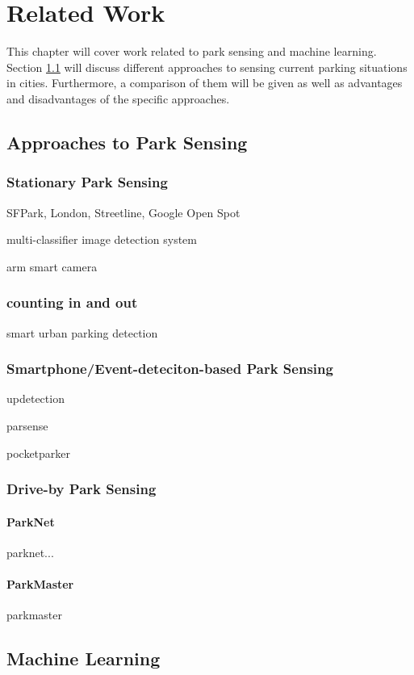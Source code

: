\chapter{Related Work}
\label{chap:relatedwork}

This chapter will cover work related to park sensing and machine learning. Section \ref{sec:parksensing} will discuss different approaches to sensing current parking situations in cities. Furthermore, a comparison of them will be given as well as advantages and disadvantages of the specific approaches. 



\section{Approaches to Park Sensing}
\label{sec:parksensing}

\subsection{Stationary Park Sensing}

SFPark, London, Streetline, Google Open Spot

multi-classifier image detection system\cite{stationary_camera_sensing}

arm smart camera \cite{stationary_camera_sensing_arm_smart_camera}

\subsection{counting in and out}
smart urban parking detection \cite{smarturbanparkingdetection}

\subsection{Smartphone/Event-deteciton-based Park Sensing}


updetection\cite{Ma:2014:USP:2674918.2674929}

parsense \cite{Nawaz:2013:PSB:2500423.2500438}

pocketparker \cite{Nandugudi:2014:PPP:2632048.2632098}


\subsection{Drive-by Park Sensing}

\subsubsection{ParkNet}
\label{sec:parknet}

parknet... \cite{Mathur:2010:PDS:1814433.1814448}

\subsubsection{ParkMaster}
 
parkmaster \cite{Grassi:2017:PIE:3132211.3134452}






\section{Machine Learning}

